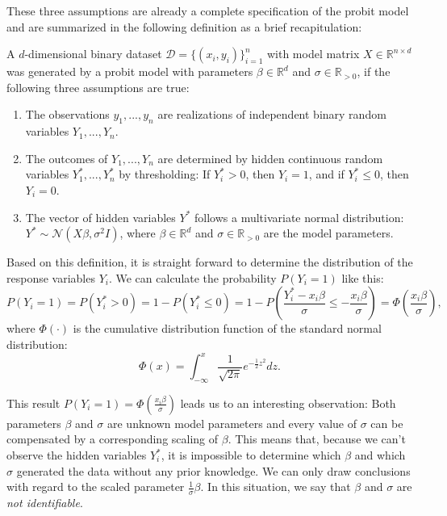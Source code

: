 These three assumptions are already a complete specification of the
probit model and are summarized in the following definition as a
brief recapitulation:

\begin{definition}
    A $d$-dimensional binary dataset $\mathcal{D} = \{(x_i, y_i)\}_{i=1}^n$
    with model matrix
    $X \in \mathbb{R}^{n \times d}$ was generated by a probit model with
    parameters $\beta \in \mathbb{R}^d$ and $\sigma \in \mathbb{R}_{>0}$, if
    the following three assumptions are true:
    \begin{enumerate}
        \item The observations $y_1, ..., y_n$ are realizations of independent
              binary random variables $Y_1, ..., Y_n$.
        \item The outcomes of $Y_1, ..., Y_n$ are determined by hidden
              continuous random variables $Y_1^\ast, ..., Y_n^\ast$ by
              thresholding: If $Y_i^\ast > 0$, then $Y_i = 1$, and if
              $Y_i^\ast \leq 0$, then $Y_i = 0$.
        \item The vector of hidden variables $Y^\ast$ follows a multivariate
              normal distribution:
              $Y^\ast \sim \mathcal{N}(X \beta, \sigma^2 I)$,
              where $\beta \in \mathbb{R}^d$ and $\sigma \in \mathbb{R}_{>0}$
              are the model parameters.
    \end{enumerate}
\end{definition}

\noindent Based on this definition, it is straight forward to determine the
distribution of the response variables $Y_i$.
We can calculate the probability $P(Y_i = 1)$ like this:
\begin{equation*}
    P(Y_i = 1) = P(Y_i^\ast > 0) = 1 - P(Y_i^\ast \leq 0)
    = 1 - P\left(\frac{Y_i^\ast - x_i \beta}{\sigma} \leq -\frac{x_i \beta}{\sigma} \right)
    = \Phi\left(\frac{x_i \beta}{\sigma} \right),
\end{equation*}
where $\Phi(\cdot)$ is the cumulative distribution function of the standard normal
distribution:
\begin{equation*}
    \Phi(x) = \int_{-\infty}^x \frac{1}{\sqrt{2 \pi}} e^{- \frac{1}{2} z^2} dz.
\end{equation*}

\noindent This result $P(Y_i = 1) = \Phi\left(\frac{x_i \beta}{\sigma} \right)$
leads us to an interesting observation:
Both parameters $\beta$ and $\sigma$ are unknown model parameters and
every value of $\sigma$ can be compensated by a corresponding scaling
of $\beta$. This means that, because we can't observe the hidden variables $Y_i^\ast$,
it is impossible to determine which $\beta$ and which $\sigma$
generated the data without any prior knowledge.
We can only draw conclusions with regard to the
scaled parameter $\frac{1}{\sigma}\beta$.
In this situation, we say that $\beta$ and $\sigma$ are
\textit{not identifiable}.

